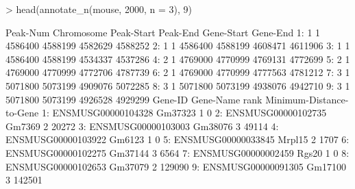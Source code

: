 \documentclass[12pt]{article}
\begin{document}
\begin{Schunk}
\begin{Sinput}
> head(annotate_n(mouse, 2000, n = 3), 9)
\end{Sinput}
\begin{Soutput}
   Peak-Num Chromosome Peak-Start Peak-End Gene-Start Gene-End
1:        1          1    4586400  4588199    4582629  4588252
2:        1          1    4586400  4588199    4608471  4611906
3:        1          1    4586400  4588199    4534337  4537286
4:        2          1    4769000  4770999    4769131  4772699
5:        2          1    4769000  4770999    4772706  4787739
6:        2          1    4769000  4770999    4777563  4781212
7:        3          1    5071800  5073199    4909076  5072285
8:        3          1    5071800  5073199    4938076  4942710
9:        3          1    5071800  5073199    4926528  4929299
              Gene-ID Gene-Name rank Minimum-Distance-to-Gene
1: ENSMUSG00000104328   Gm37323    1                        0
2: ENSMUSG00000102735    Gm7369    2                    20272
3: ENSMUSG00000103003   Gm38076    3                    49114
4: ENSMUSG00000103922    Gm6123    1                        0
5: ENSMUSG00000033845    Mrpl15    2                     1707
6: ENSMUSG00000102275   Gm37144    3                     6564
7: ENSMUSG00000002459     Rgs20    1                        0
8: ENSMUSG00000102653   Gm37079    2                   129090
9: ENSMUSG00000091305   Gm17100    3                   142501
\end{Soutput}
\end{Schunk}
\end{document}
